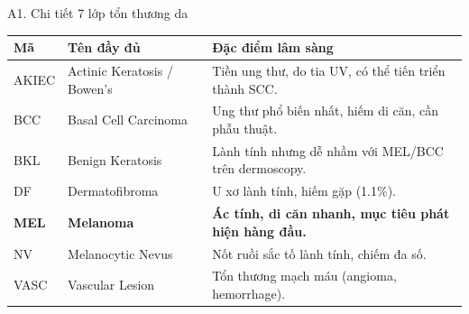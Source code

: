 \documentclass[10pt, aspectratio=169]{beamer}
\begin{document}
\begin{frame}{A1. Chi tiết 7 lớp tổn thương da}
    \scriptsize
    \begin{table}[]
        \centering
        \begin{tabular}{lp{4cm}p{5.5cm}}
        \toprule
        \rowcolor{usthblue!25} \textbf{Mã} & \textbf{Tên đầy đủ} & \textbf{Đặc điểm lâm sàng} \\
        \midrule
        AKIEC & Actinic Keratosis / Bowen's & Tiền ung thư, do tia UV, có thể tiến triển thành SCC. \\
        BCC   & Basal Cell Carcinoma        & Ung thư phổ biến nhất, hiếm di căn, cần phẫu thuật. \\
        BKL   & Benign Keratosis            & Lành tính nhưng dễ nhầm với MEL/BCC trên dermoscopy. \\
        DF    & Dermatofibroma              & U xơ lành tính, hiếm gặp (1.1\%). \\
        \textbf{MEL} & \textbf{Melanoma}    & \textbf{Ác tính, di căn nhanh, mục tiêu phát hiện hàng đầu.} \\
        NV    & Melanocytic Nevus           & Nốt ruồi sắc tố lành tính, chiếm đa số. \\
        VASC  & Vascular Lesion             & Tổn thương mạch máu (angioma, hemorrhage). \\
        \bottomrule
        \end{tabular}
    \end{table}
    \vspace{0.2cm}
\end{frame}
\end{document}
